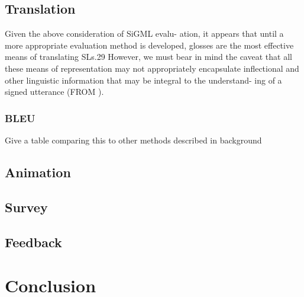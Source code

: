 \documentclass[12pt]{ociamthesis}  %
\begin{document}
\section{Translation}
 Given the above consideration of SiGML evalu- ation, it appears that until a more appropriate evaluation method is developed, glosses are the most effective means of translating SLs.29 However, we must bear in mind the caveat that all these means of representation may not appropriately encapsulate inflectional and other linguistic information that may be integral to the understand- ing of a signed utterance (FROM ).
	\subsection{BLEU}
	Give a table comparing this to other methods described in background
\section{Animation}
\section{Survey}
\section{Feedback}



\chapter{Conclusion}
\end{document}
